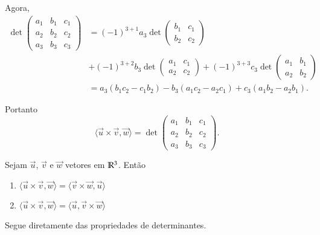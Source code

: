 Agora,
\begin{align*}
  \det \begin{pmatrix}
    a_1 & b_1 & c_1\\
    a_2 & b_2 & c_2\\
    a_3 & b_3 & c_3
  \end{pmatrix} & = (-1)^{3+1}a_3\det \begin{pmatrix}
    b_1 & c_1\\
    b_2 & c_2
  \end{pmatrix} \\ &+ (-1)^{3+2}b_3\det \begin{pmatrix}
    a_1 & c_1\\
    a_2 & c_2
  \end{pmatrix} + (-1)^{3+3}c_3\det \begin{pmatrix}
    a_1 & b_1\\
    a_2 & b_2
  \end{pmatrix}\\ &= a_3(b_1c_2 - c_1b_2) - b_3(a_1c_2 - a_2c_1) + c_3(a_1b_2 - a_2b_1).
\end{align*}

Portanto
\begin{equation}
  \langle\vec{u}\times\vec{v}, \vec{w}\rangle = \det \begin{pmatrix}
    a_1 & b_1 & c_1\\
    a_2 & b_2 & c_2\\
    a_3 & b_3 & c_3
  \end{pmatrix}.
\end{equation}

\begin{proposicao}
  Sejam $\vec{u}$, $\vec{v}$ e $\vec{w}$ vetores em $\mathbb{R}^3$. Ent\~ao
  \begin{enumerate}[label=({\alph*})]
    \item $\langle\vec{u}\times\vec{v}, \vec{w}\rangle = \langle\vec{v}\times\vec{w}, \vec{u}\rangle$
    \item $\langle\vec{u}\times\vec{v}, \vec{w}\rangle = \langle\vec{u}, \vec{v}\times\vec{w}\rangle$
  \end{enumerate}
\end{proposicao}
\begin{prova}
  Segue diretamente das propriedades de determinantes.
\end{prova}

